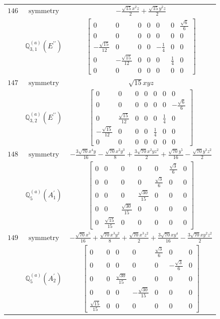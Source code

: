 \documentclass[fleqn,8pt,landscape]{jsarticle}
\begin{document}
\begin{longtable}{ccc}
$ 146 $ & $ \text{symmetry} $ & $ - \frac{\sqrt{15} x^{2} z}{2} + \frac{\sqrt{15} y^{2} z}{2} $ \\
$  $ & $ \mathbb{Q}_{3,1}^{(a)}(E^{\prime\prime}) $ & $ \begin{bmatrix} 0 & 0 & 0 & 0 & 0 & 0 & \frac{\sqrt{6}}{6} \\ 0 & 0 & 0 & 0 & 0 & 0 & 0 \\ - \frac{\sqrt{15}}{12} & 0 & 0 & 0 & - \frac{1}{4} & 0 & 0 \\ 0 & - \frac{\sqrt{15}}{12} & 0 & 0 & 0 & \frac{1}{4} & 0 \\ 0 & 0 & 0 & 0 & 0 & 0 & 0 \end{bmatrix} $ \\ \hline
$ 147 $ & $ \text{symmetry} $ & $ \sqrt{15} x y z $ \\
$  $ & $ \mathbb{Q}_{3,2}^{(a)}(E^{\prime\prime}) $ & $ \begin{bmatrix} 0 & 0 & 0 & 0 & 0 & 0 & 0 \\ 0 & 0 & 0 & 0 & 0 & 0 & - \frac{\sqrt{6}}{6} \\ 0 & \frac{\sqrt{15}}{12} & 0 & 0 & 0 & \frac{1}{4} & 0 \\ - \frac{\sqrt{15}}{12} & 0 & 0 & 0 & \frac{1}{4} & 0 & 0 \\ 0 & 0 & 0 & 0 & 0 & 0 & 0 \end{bmatrix} $ \\ \hline
$ 148 $ & $ \text{symmetry} $ & $ - \frac{3 \sqrt{70} x^{4} y}{16} - \frac{\sqrt{70} x^{2} y^{3}}{8} + \frac{3 \sqrt{70} x^{2} y z^{2}}{2} + \frac{\sqrt{70} y^{5}}{16} - \frac{\sqrt{70} y^{3} z^{2}}{2} $ \\
$  $ & $ \mathbb{Q}_{5}^{(a)}(A_{1}^{\prime}) $ & $ \begin{bmatrix} 0 & 0 & 0 & 0 & 0 & \frac{\sqrt{3}}{6} & 0 \\ 0 & 0 & 0 & 0 & \frac{\sqrt{3}}{6} & 0 & 0 \\ 0 & 0 & 0 & \frac{\sqrt{30}}{15} & 0 & 0 & 0 \\ 0 & 0 & \frac{\sqrt{30}}{15} & 0 & 0 & 0 & 0 \\ 0 & \frac{\sqrt{15}}{15} & 0 & 0 & 0 & 0 & 0 \end{bmatrix} $ \\ \hline
$ 149 $ & $ \text{symmetry} $ & $ - \frac{\sqrt{70} x^{5}}{16} + \frac{\sqrt{70} x^{3} y^{2}}{8} + \frac{\sqrt{70} x^{3} z^{2}}{2} + \frac{3 \sqrt{70} x y^{4}}{16} - \frac{3 \sqrt{70} x y^{2} z^{2}}{2} $ \\
$  $ & $ \mathbb{Q}_{5}^{(a)}(A_{2}^{\prime}) $ & $ \begin{bmatrix} 0 & 0 & 0 & 0 & \frac{\sqrt{3}}{6} & 0 & 0 \\ 0 & 0 & 0 & 0 & 0 & - \frac{\sqrt{3}}{6} & 0 \\ 0 & 0 & \frac{\sqrt{30}}{15} & 0 & 0 & 0 & 0 \\ 0 & 0 & 0 & - \frac{\sqrt{30}}{15} & 0 & 0 & 0 \\ \frac{\sqrt{15}}{15} & 0 & 0 & 0 & 0 & 0 & 0 \end{bmatrix} $ \\ \hline

\end{longtable}
\end{document}
